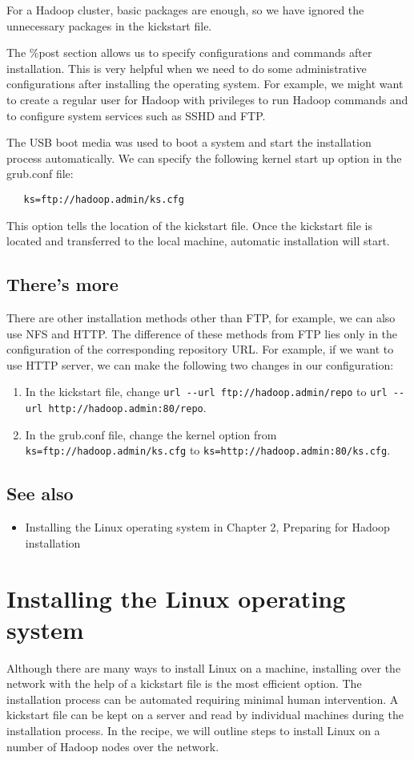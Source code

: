 For a Hadoop cluster, basic packages are enough, so we have ignored the unnecessary packages in the kickstart file.

The \%post section allows us to specify configurations and commands after installation. This is very helpful when we need to do some administrative configurations after installing the operating system. For example, we might want to create a regular user for Hadoop with privileges to run Hadoop commands and to configure system services such as SSHD and FTP.

The USB boot media was used to boot a system and start the installation process automatically. We can specify the following kernel start up option in the grub.conf file:
\begin{verbatim}
   ks=ftp://hadoop.admin/ks.cfg
\end{verbatim}
This option tells the location of the kickstart file. Once the kickstart file is located and transferred to the local machine, automatic installation will start.
\subsection*{There's more}
There are other installation methods other than FTP, for example, we can also use NFS and HTTP. The difference of these methods from FTP lies only in the configuration of the corresponding repository URL. For example, if we want to use HTTP server, we can make the following two changes in our configuration: 
\begin{enumerate}
  \item In the kickstart file, change \verb|url --url ftp://hadoop.admin/repo| to \verb|url --url http://hadoop.admin:80/repo|.
  \item In the grub.conf file, change the kernel option from \verb|ks=ftp://hadoop.admin/ks.cfg| to \verb|ks=http://hadoop.admin:80/ks.cfg|.
\end{enumerate}
\subsection*{See also}
\begin{itemize}
  \item Installing the Linux operating system in Chapter 2, Preparing for Hadoop installation
\end{itemize}
\section{Installing the Linux operating system}
Although there are many ways to install Linux on a machine, installing over the network with the help of a kickstart file is the most efficient option. The installation process can be automated requiring minimal human intervention. A kickstart file can be kept on a server and read by individual machines during the installation process. In the recipe, we will outline steps to install Linux on a number of Hadoop nodes over the network.
